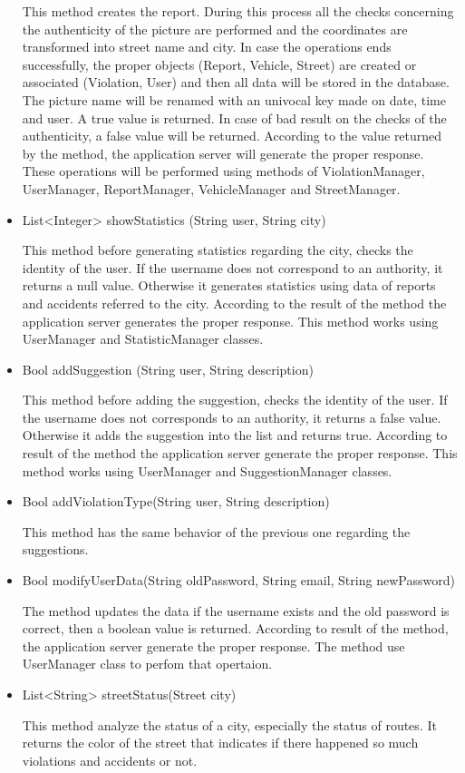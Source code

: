 \begin{itemize}
	 This method creates the report. During this process all the checks concerning the authenticity of the picture are performed and the coordinates are transformed into street name and city. In case the operations ends successfully, the proper objects (Report, Vehicle, Street) are created or associated (Violation, User) and then all data will be stored in the database. The picture name will be renamed with an univocal key made on date, time and user. A true value is returned.
	 In case of bad result on the checks of the authenticity, a false value will be returned.
	 According to the value returned by the method, the application server will generate the proper response. 
	 These operations will be performed using methods of ViolationManager, UserManager, ReportManager, VehicleManager and StreetManager.
	 
	 \item
	List<Integer> showStatistics (String user, String city)
	
	This method before generating statistics regarding the city, checks the identity of the user. 
	If the username does not correspond to an authority, it returns a null value.
	Otherwise it generates statistics using data of reports and accidents referred to the city.
	According to the result of the method the application server generates the proper response.
	This method works using UserManager and StatisticManager classes.
	
	\item 
	Bool addSuggestion (String user, String description)
	
	This method before adding the suggestion, checks the identity of the user. 
	If the username does not corresponds to an authority, it returns a false value.
	Otherwise it adds the suggestion into the list and returns true.
	According to result of the method the application server generate the proper response.
	This method works using UserManager and SuggestionManager classes.
	
	\item 
	Bool addViolationType(String user, String description)
	
	This method has the same behavior of the previous one regarding the suggestions.
	
	\item 
	Bool modifyUserData(String oldPassword, String email, String newPassword)
	
	The method updates the data if the username exists and the old password is correct, then
	a boolean value is returned. According to result of the method, the application server generate the proper response.
	The method use UserManager class to perfom that opertaion.
	
	\item
	List<String> streetStatus(Street city)
	
	This method analyze the status of a city, especially the status of routes. It returns the color of the street that indicates if there happened so much violations and accidents or not.
\end{itemize}

